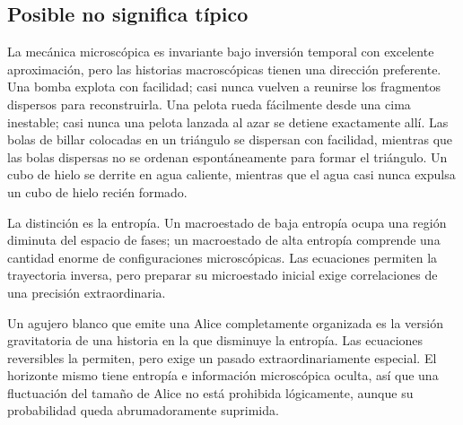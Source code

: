 \subsection{Posible no significa típico}

La mecánica microscópica es invariante bajo inversión temporal con excelente aproximación, pero las historias macroscópicas tienen una dirección preferente. Una bomba explota con facilidad; casi nunca vuelven a reunirse los fragmentos dispersos para reconstruirla. Una pelota rueda fácilmente desde una cima inestable; casi nunca una pelota lanzada al azar se detiene exactamente allí. Las bolas de billar colocadas en un triángulo se dispersan con facilidad, mientras que las bolas dispersas no se ordenan espontáneamente para formar el triángulo. Un cubo de hielo se derrite en agua caliente, mientras que el agua casi nunca expulsa un cubo de hielo recién formado.

La distinción es la entropía. Un macroestado de baja entropía ocupa una región diminuta del espacio de fases; un macroestado de alta entropía comprende una cantidad enorme de configuraciones microscópicas. Las ecuaciones permiten la trayectoria inversa, pero preparar su microestado inicial exige correlaciones de una precisión extraordinaria.

\begin{classroomqa}
\end{classroomqa}

Un agujero blanco que emite una Alice completamente organizada es la versión gravitatoria de una historia en la que disminuye la entropía. Las ecuaciones reversibles la permiten, pero exige un pasado extraordinariamente especial. El horizonte mismo tiene entropía e información microscópica oculta, así que una fluctuación del tamaño de Alice no está prohibida lógicamente, aunque su probabilidad queda abrumadoramente suprimida.

\begin{classroomqa}
\end{classroomqa}

